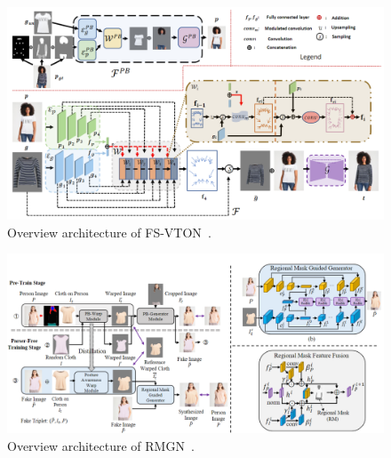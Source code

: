 \begin{figure}[h!]
    \centering
    \includegraphics[width=\linewidth]{content/resources/images/literature-review/fsvton.png}
    \caption{Overview architecture of FS-VTON~\cite{He-CVPR2022-Style}.}
    \label{fig:vton-fsvton}
\end{figure}

\begin{figure}[h!]
    \centering
    \includegraphics[width=\linewidth]{content/resources/images/literature-review/rmgn.png}
    \caption{Overview architecture of RMGN~\cite{Lin-IJCAI2022-RMGN}.}
    \label{fig:vton-rmgn}
\end{figure}



